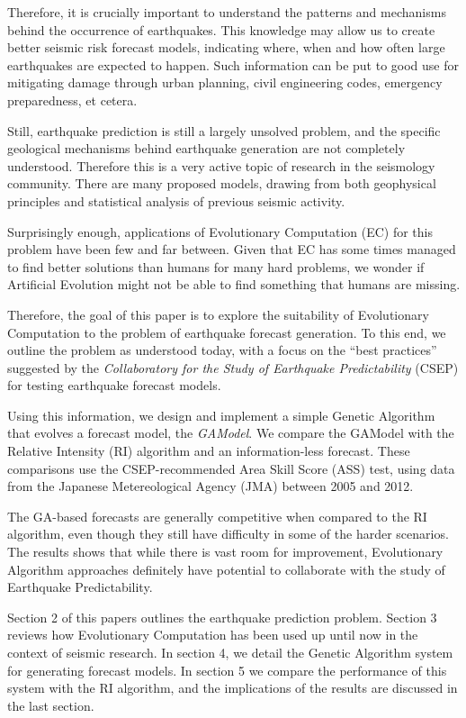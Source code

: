 \documentclass{sig-alternate}
\begin{document}
Therefore, it is crucially important to understand the patterns and
mechanisms behind the occurrence of earthquakes. This knowledge may
allow us to create better seismic risk forecast models, indicating
where, when and how often large earthquakes are expected to
happen. Such information can be put to good use for mitigating damage
through urban planning, civil engineering codes, emergency
preparedness, et cetera.

Still, earthquake prediction is still a largely unsolved problem, and
the specific geological mechanisms behind earthquake generation are
not completely understood. Therefore this is a very active topic of
research in the seismology community. There are many proposed models,
drawing from both geophysical principles and statistical analysis of
previous seismic activity.

Surprisingly enough, applications of Evolutionary Computation (EC) for
this problem have been few and far between. Given that EC has some
times managed to find better solutions than humans for many hard
problems, we wonder if Artificial Evolution might not be able to find
something that humans are missing.

Therefore, the goal of this paper is to explore the suitability of
Evolutionary Computation to the problem of earthquake forecast
generation. To this end, we outline the problem as understood today,
with a focus on the ``best practices'' suggested by the
\emph{Collaboratory for the Study of Earthquake Predictability} (CSEP)
for testing earthquake forecast models.

Using this information, we design and implement a simple Genetic
Algorithm that evolves a forecast model, the \emph{GAModel}. We
compare the GAModel with the Relative Intensity (RI) algorithm and an
information-less forecast. These comparisons use the CSEP-recommended
Area Skill Score (ASS) test, using data from the Japanese
Metereological Agency (JMA) between 2005 and 2012.

The GA-based forecasts are generally competitive when compared to the
RI algorithm, even though they still have difficulty in some of the
harder scenarios. The results shows that while there is vast room for
improvement, Evolutionary Algorithm approaches definitely have
potential to collaborate with the study of Earthquake Predictability.

Section 2 of this papers outlines the earthquake prediction
problem. Section 3 reviews how Evolutionary Computation has been used
up until now in the context of seismic research. In section 4, we
detail the Genetic Algorithm system for generating forecast models. In
section 5 we compare the performance of this system with the RI
algorithm, and the implications of the results are discussed in the
last section.
\end{document}
